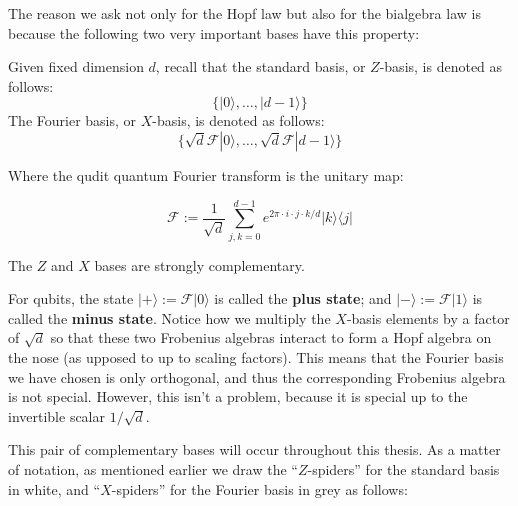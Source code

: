 The reason we ask not only for the Hopf law but also for the bialgebra law is  because the following two very important bases have this property:

\begin{example}
Given fixed dimension $d$, recall that the standard basis, or $Z$-basis,  is denoted as follows:
$$\{ |0\rangle, \ldots, |d-1\rangle \}$$
The Fourier basis, or $X$-basis, is denoted as follows:
$$\{\sqrt{d} \mathcal{F}|0\rangle, \ldots, \sqrt{d}\mathcal{F}|d-1\rangle \}$$

Where the qudit quantum Fourier transform is the unitary map:

$$\mathcal{F} := \dfrac{1}{\sqrt{d}} \sum_{j,k=0}^{d-1} e^{2\pi\cdot i \cdot j \cdot k/d} | k\rangle \langle j | $$

The $Z$ and $X$ bases are strongly complementary.
\end{example}

For qubits, the  state $|+\rangle:=\mathcal{F}|0\rangle$ is called the {\bf plus state}; and  $|-\rangle:=\mathcal{F}|1\rangle$ is called the {\bf minus state}.
Notice how we multiply the $X$-basis elements by a factor of $\sqrt d$ so that these two Frobenius algebras interact to form a Hopf algebra on the nose (as upposed to up to scaling factors).  This means that the Fourier basis we have chosen is only orthogonal, and thus the corresponding Frobenius algebra is not special.  However, this isn't a problem, because it is special up to the invertible  scalar $1/\sqrt{d}$.

This pair of complementary bases will occur throughout this thesis.  As a matter of notation, as mentioned earlier we draw the ``$Z$-spiders'' for the standard basis in white,
and ``$X$-spiders'' for the Fourier basis in  grey as follows:

